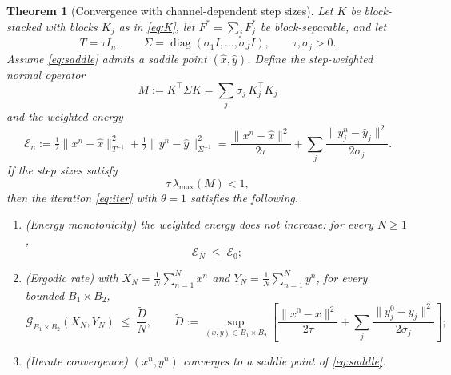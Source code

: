 \documentclass{article}
\newcommand{\diag}{\operatorname{diag}}
\newtheorem{theorem}{Theorem}
\begin{document}
\begin{theorem}[Convergence with channel-dependent step sizes]
\label{thm:main}
Let $K$ be block-stacked with blocks $K_j$ as in \eqref{eq:K}, let $F^\ast=\sum_jF_j^\ast$ be block-separable, and let
\[
T=\tau I_n,
\qquad
\Sigma=\diag(\sigma_1I,\dots,\sigma_JI),
\qquad
\tau,\sigma_j>0 .
\]
Assume \eqref{eq:saddle} admits a saddle point $(\hat x,\hat y)$. Define the step-weighted normal operator
\begin{equation}
\label{eq:M}
M:=K^\top\Sigma K=\sum_{j}\sigma_j\,K_j^\top K_j
\end{equation}
and the weighted energy
\begin{equation}
\label{eq:energy}
\mathcal E_n
:=\tfrac12\|x^n-\hat x\|_{T^{-1}}^2+\tfrac12\|y^n-\hat y\|_{\Sigma^{-1}}^2
=\frac{\|x^n-\hat x\|^2}{2\tau}+\sum_j\frac{\|y_j^n-\hat y_j\|^2}{2\sigma_j}.
\end{equation}
If the step sizes satisfy
\begin{equation}
\label{eq:cond}
\tau\,\lambda_{\max}(M)<1,
\end{equation}
then the iteration \eqref{eq:iter} with $\theta=1$ satisfies the following.
\begin{enumerate}[label=\textup{(\alph*)}]
\item \emph{(Energy monotonicity)} the weighted energy does not increase: for every $N\ge1$,
\begin{equation}
\label{eq:contraction}
\mathcal E_N\;\le\;\mathcal E_0 ;
\end{equation}
\item \emph{(Ergodic rate)} with $X_N=\frac1N\sum_{n=1}^Nx^n$ and $Y_N=\frac1N\sum_{n=1}^Ny^n$, for every bounded $B_1\times B_2$,
\begin{equation}
\label{eq:rate}
\mathcal G_{B_1\times B_2}(X_N,Y_N)\;\le\;\frac{\widetilde D}{N},
\qquad
\widetilde D:=\sup_{(x,y)\in B_1\times B_2}
\left[\frac{\|x^0-x\|^2}{2\tau}+\sum_j\frac{\|y_j^0-y_j\|^2}{2\sigma_j}\right];
\end{equation}
\item \emph{(Iterate convergence)} $(x^n,y^n)$ converges to a saddle point of \eqref{eq:saddle}.
\end{enumerate}
\end{theorem}
\end{document}

